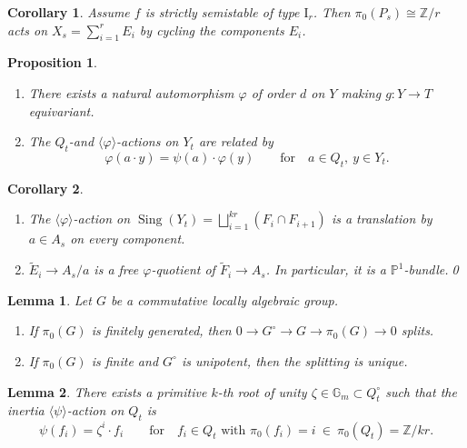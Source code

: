 \documentclass[10pt,a4paper]{amsart}
\newtheorem{lemma}{Lemma}
\newtheorem{corollary}{Corollary}
\newtheorem{proposition}{Proposition}
\newcommand{\GG}{\mathbb{G}}
\newcommand{\PP}{\mathbb{P}}
\DeclareMathOperator{\Sing}{Sing}
\newcommand{\ZZ}{\mathbb{Z}}
\begin{document}
			\begin{corollary} \label{cor:pi_0-action on X_s}
				Assume $f$ is strictly semistable of type $\mathrm I_r$. Then $\pi_0(P_s) \cong \ZZ/r$ acts on $X_s = \sum_{i=1}^r E_i$ by cycling the components $E_i$.
			\end{corollary}

			\begin{proposition} \label{prop:varphi-action}
				\begin{enumerate}
					\item There exists a natural automorphism $\varphi$ of order $d$ on $Y$ making $g : Y \to T$ equivariant.
					\item The $Q_t$-and $\langle \varphi \rangle$-actions on $Y_t$ are related by
					\[ \varphi(a \cdot y) = \psi(a) \cdot \varphi(y) \qquad\mbox{for}\quad a \in Q_t , \ y \in Y_t .\]
				\end{enumerate}
			\end{proposition}

			\begin{corollary} \label{cor:classification of multiple fiber iii:varphi-action on Sing}
				\begin{enumerate}
					\item The $\langle \varphi \rangle$-action on $\Sing(Y_t) = \bigsqcup_{i=1}^{kr} (F_i \cap F_{i+1})$ is a translation by $a \in A_s$ on every component.
					\item $\tilde E_i \to A_s/a$ is a free $\varphi$-quotient of $\tilde F_i \to A_s$. In particular, it is a $\PP^1$-bundle.\qed
				\end{enumerate}
			\end{corollary}

		\begin{lemma} \label{lem:pi_0 sequence splits}
			Let $G$ be a commutative locally algebraic group.
			\begin{enumerate}
				\item If $\pi_0(G)$ is finitely generated, then $0 \to G^{\circ} \to G \to \pi_0(G) \to 0$ splits.
				\item If $\pi_0(G)$ is finite and $G^{\circ}$ is unipotent, then the splitting is unique.
			\end{enumerate}
		\end{lemma}

			\begin{lemma} \label{lem:classification of multiple fiber iii:psi-action}
				There exists a primitive $k$-th root of unity $\zeta \in \GG_m \subset Q_t^\circ$ such that the inertia $\langle \psi \rangle$-action on $Q_t$ is
				\[ \psi(f_i) = \zeta^i \cdot f_i \qquad\mbox{for}\quad f_i \in Q_t \mbox{ with } \pi_0(f_i) = i \ \in \ \pi_0(Q_t) = \ZZ/kr .\]
			\end{lemma}
\end{document}
